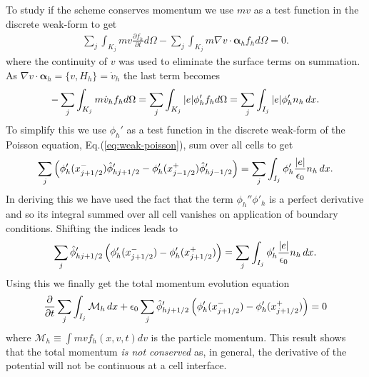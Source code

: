 \documentclass[11pt, reqno]{amsart}
\newcommand{\eqr}[1]{Eq.\thinspace(#1)}
\newcommand{\pfrac}[2]{\frac{\partial #1}{\partial #2}}
\newcommand{\gvec}[1]{\boldsymbol{#1}}
\theoremstyle{definition}
\begin{document}
To study if the scheme conserves momentum we use $mv$ as a test
function in the discrete weak-form to get
\begin{align}
  \sum_j \int_{K_j} mv\pfrac{f_h}{t}d\Omega
  -
  \sum_j
  \int_{K_j}
  m \nabla v \cdot \gvec{\alpha}_h
  f_h d\Omega = 0. \label{eq:dis-momentum-1}
\end{align}
where the continuity of $v$ was used to eliminate the surface terms on
summation. As $\nabla v \cdot \gvec{\alpha}_h = \{v,H_h\} = \dot{v}_h$
the last term becomes
\begin{align}
  -\sum_j \int_{K_j} m\dot{v}_h f_h d\Omega
  =
  \sum_j
  \int_{K_j} |e| \phi'_h f_h d\Omega
  =
  \sum_j
  \int_{I_j} |e| \phi'_h n_h \thinspace dx.
\end{align}
To simplify this we use $\phi_h'$ as a test function in the discrete
weak-form of the Poisson equation, \eqr{\ref{eq:weak-poisson}}, sum
over all cells to get
\begin{align}
  \sum_j 
  \left(
    \phi'_h(x^-_{j+1/2})\hat{\phi}'_{hj+1/2} -  \phi'_h(x^+_{j-1/2})\hat{\phi}'_{hj-1/2}
  \right)
  =
  \sum_j
  \int_{I_j}
  \phi'_h
  \frac{|e|}{\epsilon_0}
  n_h
  \thinspace dx.
\end{align}
In deriving this we have used the fact that the term $\phi_h''\phi'_h$
is a perfect derivative and so its integral summed over all cell
vanishes on application of boundary conditions. Shifting the indices
leads to
\begin{align}
  \sum_j 
  \hat{\phi}'_{hj+1/2}
  \left(
    \phi'_h(x^-_{j+1/2}) -  \phi'_h(x^+_{j+1/2})
  \right)
  =
  \sum_j
  \int_{I_j}
  \phi'_h
  \frac{|e|}{\epsilon_0}
  n_h
  \thinspace dx.
\end{align}
Using this we finally get the total momentum evolution equation
\begin{align}
  \frac{\partial }{\partial t}
  \sum_j \int_{I_j} \mathcal{M}_h \thinspace dx
  +
  \epsilon_0
  \sum_j 
  \hat{\phi}'_{hj+1/2}
  \left(
    \phi'_h(x^-_{j+1/2}) -  \phi'_h(x^+_{j+1/2})
  \right)
  =
  0
\end{align}
where $\mathcal{M}_h \equiv \int mv f_h(x,v,t) dv$ is the particle
momentum. This result shows that the total momentum \emph{is not
  conserved} as, in general, the derivative of the potential will not
be continuous at a cell interface.
\end{document}
